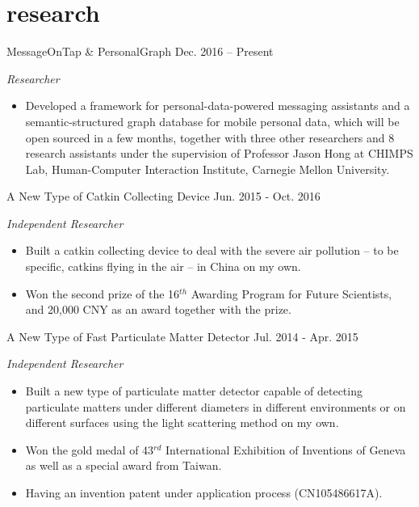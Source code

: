 \documentclass[]{adamyi-cv} %
\begin{document}
\section{research}

\begin{entrylist}


\entry
{MessageOnTap \& PersonalGraph}
{Dec. 2016 -- Present}
{\emph{Researcher}
\begin{itemize}
\item Developed a framework for personal-data-powered messaging assistants and a semantic-structured graph database for mobile personal data, which will be open sourced in a few months, together with three other researchers and 8 research assistants under the supervision of Professor Jason Hong at CHIMPS Lab, Human-Computer Interaction Institute, Carnegie Mellon University.
\end{itemize}}


\entry
{A New Type of Catkin Collecting Device}
{Jun. 2015 - Oct. 2016}
{\emph{Independent Researcher}
\begin{itemize}
\item Built a catkin collecting device to deal with the severe air pollution – to be specific, catkins flying in the air – in China on my own.
\item Won the second prize of the 16$^{th}$ Awarding Program for Future Scientists, and 20,000 CNY as an award together with the prize.
\end{itemize}}


\entry
{A New Type of Fast Particulate Matter Detector}
{Jul. 2014 - Apr. 2015}
{\emph{Independent Researcher}
\begin{itemize}
\item Built a new type of particulate matter detector capable of detecting particulate matters under different diameters in different environments or on different surfaces using the light scattering method on my own.
\item Won the gold medal of 43$^{rd}$ International Exhibition of Inventions of Geneva as well as a special award from Taiwan.
\item Having an invention patent under application process (CN105486617A).
\end{itemize}}


\end{entrylist}
\end{document}
